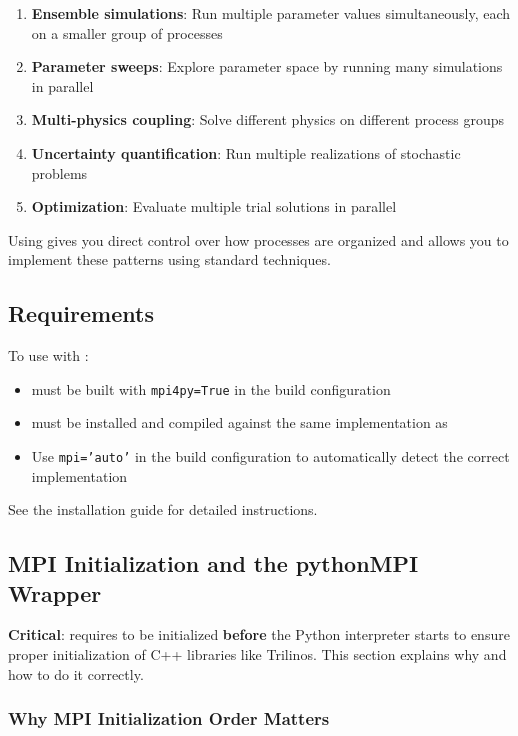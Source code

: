 \begin{enumerate}
\item \textbf{Ensemble simulations}: Run multiple parameter values simultaneously, each on a smaller group of processes
\item \textbf{Parameter sweeps}: Explore parameter space by running many simulations in parallel
\item \textbf{Multi-physics coupling}: Solve different physics on different process groups
\item \textbf{Uncertainty quantification}: Run multiple realizations of stochastic problems
\item \textbf{Optimization}: Evaluate multiple trial solutions in parallel
\end{enumerate}

Using \mpifo gives you direct control over how processes are organized and allows you to implement these patterns using standard \MPI techniques.

\subsection{Requirements}

To use \mpifo with \escript:
\begin{itemize}
\item \escript must be built with \texttt{mpi4py=True} in the build configuration
\item \mpifo must be installed and compiled against the same \MPI implementation as \escript
\item Use \texttt{mpi='auto'} in the build configuration to automatically detect the correct \MPI implementation
\end{itemize}

See the \escript installation guide for detailed instructions.

\subsection{MPI Initialization and the pythonMPI Wrapper}
\label{sec:mpi4py:init}

\textbf{Critical}: \escript requires \MPI to be initialized \textbf{before} the Python interpreter starts to ensure proper initialization of C++ libraries like Trilinos. This section explains why and how to do it correctly.

\subsubsection{Why MPI Initialization Order Matters}

